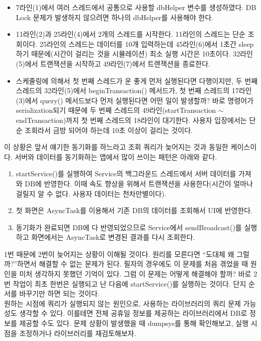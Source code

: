 \begin{itemize}
\item 7라인(1)에서 여러 스레드에서 공통으로 사용할 dbHelper 변수를 생성하였다. DB Lock 문제가 발생하지 않으려면 하나의 dbHelper를 사용해야 한다.
\item 11라인(2)과 25라인(4)에서 2개의 스레드를 시작한다.
11라인의 스레드는 단순 조회이다.
25라인의 스레드는 데이터를 10개 입력하는데 45라인(6)에서 1초간 sleep하기 때문에(시간이 걸리는 것을 시뮬레이션) 최소 실행 시간은 10초이다. 32라인(5)에서 트랜잭션을 시작하고 49라인(7)에서 트랜잭션을 종료한다.
\item 스케줄링에 의해서 첫 번째 스레드가 운 좋게 먼저 실행된다면 다행이지만, 두 번째 스레드의 32라인(5)에서 beginTransaction() 메서드가, 첫 번째 스레드의 17라인(3)에서 query() 메서드보다 먼저 실행된다면 어떤 일이 발생할까? 바로 명령어가 serialization되기 때문에 두 번째 스레드의 49라인(startTransaction $\sim$ endTransaction)까지 첫 번째 스레드의 18라인이 대기한다. 사용자 입장에서는 단순 조회라서 금방 되어야 하는데 10초 이상이 걸리는 것이다. 
\end{itemize}

이 상황은 앞서 얘기한 동기화를 하느라고 조회 쿼리가 늦어지는 것과 동일한 케이스이다. 
서버와 데이터를 동기화하는 앱에서 많이 쓰이는 패턴은 아래와 같다.
\begin{enumerate}
\item startService()를 실행하여 Service의 백그라운드 스레드에서 서버 데이터를 가져와 DB에 반영한다. 이때 속도 향상을 위해서 트랜잭션을 사용한다(시간이 얼마나 걸릴지 알 수 없다. 사용자 데이터는 천차만별이다).
\item 첫 화면은 AsyncTask를 이용해서 기존 DB의 데이터를 조회해서 UI에 반영한다. 
\item 동기화가 완료되면 DB에 다 반영되었으므로 Service에서 sendBroadcast()를 실행하고 화면에서는 AsyncTask로 변경된 결과를 다시 조회한다.
\end{enumerate}

1번 때문에 2번이 늦어지는 상황이 이해될 것이다. 원리를 모른다면 ``도대체 왜 그럴까?''하면서 해결할 수 없는 문제가 된다. 
필자의 경우에도 이 문제를 처음 겪었을 때 원인을 미처 생각하지 못했던 기억이 있다. 
그럼 이 문제는 어떻게 해결해야 할까? 바로 2번 작업이 최초 한번은 실행되고 난 다음에 startService()를 실행하는 것이다. 
단지 순서를 바꾸기만 하면 되는 것이다.\\

원하는 시점에 쿼리가 실행되지 않는 원인으로, 사용하는 라이브러리의 쿼리 문제 가능성도 생각할 수 있다. 이를테면 전체 공휴일 정보를 제공하는 라이브러리에서 DB로 정보를 제공할 수도 있다.
문제 상황이 발생했을 때 dumpsys를 통해 확인해보고, 실행 시점을 조정하거나 라이브러리를 재검토해보자.


